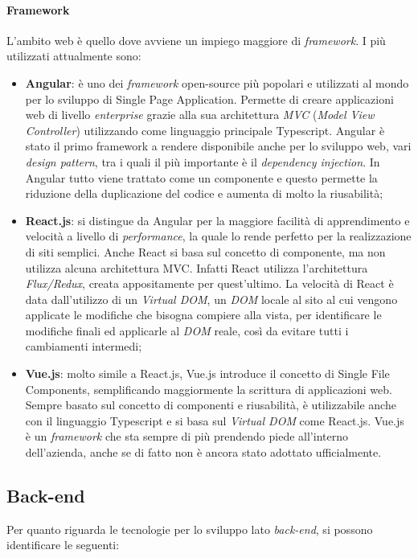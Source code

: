 \paragraph{Framework} L'ambito web è quello dove avviene un impiego maggiore di \textit{framework}. I più utilizzati attualmente sono:
\begin{itemize}
  \item \textbf{Angular}: è uno dei \textit{framework} open-source più popolari e utilizzati al mondo per lo sviluppo di \gls{Single Page Application}. Permette di creare applicazioni web di livello \textit{enterprise} grazie alla sua architettura \textit{MVC} (\textit{Model View Controller}) utilizzando come linguaggio principale Typescript. Angular è stato il primo framework a rendere disponibile anche per lo sviluppo web, vari \textit{design pattern}, tra i quali il più importante è il \textit{dependency injection}. In Angular tutto viene trattato come un componente e questo permette la riduzione della duplicazione del codice e aumenta di molto la riusabilità;
  
  \item \textbf{React.js}: si distingue da Angular per la maggiore facilità di apprendimento e velocità a livello di \textit{performance}, la quale lo rende perfetto per la realizzazione di siti semplici. Anche React si basa sul concetto di componente, ma non utilizza alcuna architettura MVC. Infatti React utilizza l'architettura \textit{Flux/Redux}, creata appositamente per quest'ultimo. La velocità di React è data dall'utilizzo di un \textit{Virtual DOM}, un \textit{DOM} locale al sito al cui vengono applicate le modifiche che bisogna compiere alla vista, per identificare le modifiche finali ed applicarle al \textit{DOM} reale, così da evitare tutti i cambiamenti intermedi;
  
  \item \textbf{Vue.js}: molto simile a React.js, Vue.js introduce il concetto di \gls{Single File Components}, semplificando maggiormente la scrittura di applicazioni web. Sempre basato sul concetto di componenti e riusabilità, è utilizzabile anche con il linguaggio Typescript e si basa sul \textit{Virtual DOM} come React.js. Vue.js è un \textit{framework} che sta sempre di più prendendo piede all'interno dell'azienda, anche se di fatto non è ancora stato adottato ufficialmente.
\end{itemize}

\subsection{Back-end}
Per quanto riguarda le tecnologie per lo sviluppo lato \textit{back-end}, si possono identificare le seguenti:

